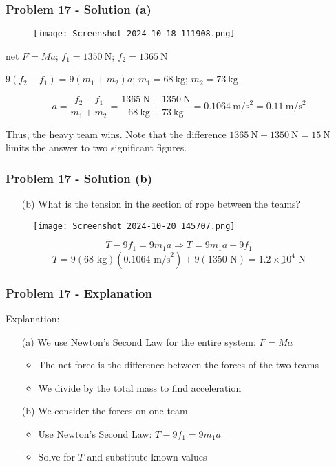 \documentclass{beamer}
\begin{document}
\begin{}
\begin{frame}
\frametitle{Problem 17 - Solution (a)}
\begin{figure}
    \centering
    \texttt{[image: Screenshot 2024-10-18 111908.png]}
\end{figure}

net $F = Ma$; $f_1 = 1350 \mathrm{~N}$; $f_2 = 1365 \mathrm{~N}$

$9(f_2 - f_1) = 9(m_1 + m_2)a$; $m_1 = 68 \mathrm{~kg}$; $m_2 = 73 \mathrm{~kg}$

\begin{equation*}
a = \frac{f_2 - f_1}{m_1 + m_2} = \frac{1365 \mathrm{~N} - 1350 \mathrm{~N}}{68 \mathrm{~kg} + 73 \mathrm{~kg}} = 0.1064 \mathrm{~m} / \mathrm{s}^{2} = \underline{0.11 \mathrm{~m} / \mathrm{s}^{2}}
\end{equation*}

Thus, the heavy team wins. Note that the difference $1365 \mathrm{~N} - 1350 \mathrm{~N} = 15 \mathrm{~N}$ limits the answer to two significant figures.
\end{frame}

\begin{frame}
\frametitle{Problem 17 - Solution (b)}
\begin{itemize}
    \item[(b)] What is the tension in the section of rope between the teams?
\end{itemize}
\begin{figure}
    \centering
    \texttt{[image: Screenshot 2024-10-20 145707.png]}
\end{figure}

\begin{equation*}
T - 9f_1 = 9m_1a \Rightarrow T = 9m_1a + 9f_1
\end{equation*}
\begin{equation*}
T = 9(68 \text{ kg})(0.1064 \text{ m/s}^2) + 9(1350 \text{ N}) = \underline{1.2 \times 10^{4} \text{ N}}
\end{equation*}
\end{frame}

\begin{frame}
\frametitle{Problem 17 - Explanation}
Explanation:
\begin{itemize}
    \item[(a)] We use Newton's Second Law for the entire system: $F = Ma$
    \begin{itemize}
        \item The net force is the difference between the forces of the two teams
        \item We divide by the total mass to find acceleration
    \end{itemize}
    \item[(b)] We consider the forces on one team
    \begin{itemize}
        \item Use Newton's Second Law: $T - 9f_1 = 9m_1a$
        \item Solve for $T$ and substitute known values
    \end{itemize}
    \end{itemize}
\end{frame}


\end{}
\end{document}
